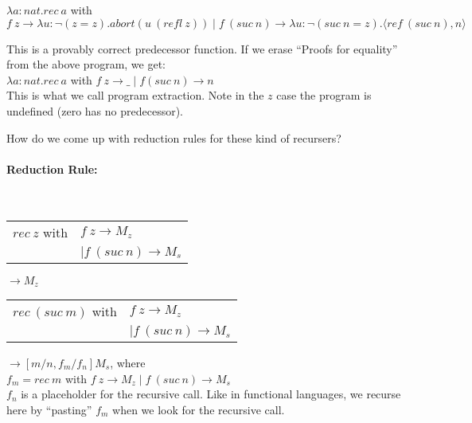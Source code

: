 \documentclass[12 pt]{article}
\begin{document}
        $\lambda a : nat. rec\ a $ with $f\ z \to  \lambda u: \neg
        (z=z). abort (u\ (refl\ z)) \mid f\ (suc\ n)
        \to \lambda u: \neg (suc\ n = z).\langle ref\ (suc\ n), n
        \rangle$

        This is a provably correct predecessor function. If we erase
        ``Proofs for equality'' from the above program, we get:
        \\ $\lambda a : nat. rec\ a$ with $f\ z \to \_ \mid f(suc\ n)
        \to n$
        \\ This is what we call program extraction. Note in the $z$
        case the program is undefined (zero has no predecessor).

        How do we come up with reduction rules for these kind of
        recursers?
        \paragraph{Reduction Rule:}~
        \\
        \begin{tabular}{l l}
          $rec\ z$ with &$f\ z \to M_z$
          \\ &$ \mid f\ (suc\ n) \to M_s$
        \end{tabular}
        $\to M_z$
        \\
        \begin{tabular}{l l}
          $rec\ (suc\ m)$ with &$f\ z \to M_z$
          \\ &$ \mid f\ (suc\ n) \to M_s$
        \end{tabular}
        $\to [m/n,f_m/f_n]M_s$, where
        \\ $f_m = rec\ m$ with $f\ z \to M_z \mid f\ (suc\ n) \to M_s$
        \\ $f_n$ is a placeholder for the recursive call. Like in
        functional languages, we recurse here by ``pasting'' $f_m$
        when we look for the recursive call.
        \begin{prooftree}
        \end{prooftree}
      
\end{document}
